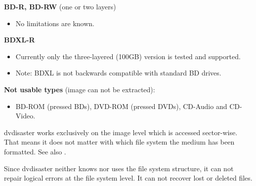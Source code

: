 {\medskip

{\bf BD-R, BD-RW} \quad (one or two layers)

\begin{itemize}
\item No limitations are known.
\end{itemize}

\medskip

{\bf BDXL-R}

\begin{itemize}
\item Currently only the three-layered (100GB) version is tested and supported.
\item Note: BDXL is not backwards compatible with standard BD drives.
\end{itemize}

\medskip

{\bf Not usable types} (image can not be extracted):

\begin{itemize}
\item BD-ROM (pressed BDs), DVD-ROM (pressed DVDs), CD-Audio and CD-Video.
\end{itemize}}

   {dvdisaster works exclusively on the image level which is accessed
     sector-wise. That means it does not matter with which file system
     the medium has been formatted. See also .

     \smallskip
     
     Since dvdisaster neither knows nor uses the file system structure,
     it can not repair logical errors at the file system level. It can not
     recover lost or deleted files. }

